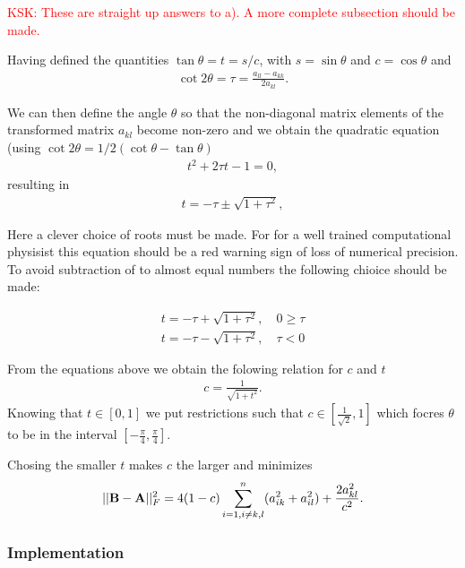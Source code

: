 \documentclass[11pt,a4paper,english,draft]{article}
\numberwithin{equation}{section}
\begin{document}
\textcolor{red}{KSK: These are straight up answers to a). A more complete subsection should be made.}

Having defined the quantities $\tan\theta = t= s/c$, with $s=\sin\theta$ and $c=\cos\theta$ and
\begin{gather}\cot 2\theta=\tau = \frac{a_{ll}-a_{kk}}{2a_{kl}}.
\end{gather}

We can then define the angle $\theta$ so that the non-diagonal matrix elements of the transformed matrix 
$a_{kl}$ become non-zero and
we obtain the quadratic equation (using $\cot 2\theta=1/2(\cot \theta-\tan\theta)$
\begin{gather}
t^2+2\tau t-1= 0,
\end{gather}
resulting in 
\begin{gather}
  t = -\tau \pm \sqrt{1+\tau^2},
\end{gather}

Here a clever choice of roots must be made. For for a well trained computational physisist this equation should be a red warning sign of loss of numerical precision. To avoid subtraction of to almost equal numbers the following chioice should be made:

\begin{align*}
t=  -\tau + \sqrt{1+\tau^2}, \quad   0  \geq \tau \\
t=  -\tau - \sqrt{1+\tau^2}, \quad   \tau <  0
\end{align*}

From the equations above we obtain the folowing relation for $c$ and $t$
\begin{gather}
   c = \frac{1}{\sqrt{1+t^2}}.
\end{gather}
Knowing that $t \in [0,1]$ we put restrictions such that $c \in [\frac{1}{\sqrt{2}}, 1]$ which focres $\theta$ to be in the interval $[- \frac{\pi}{4},\frac{\pi}{4}]$.  

Chosing the smaller $t$ makes $c$ the larger and minimizes 
\begin{gather}
||{\bf B}-{\bf A}||_F^2=4(1-c)\sum_{i=1,i\ne k,l}^n(a_{ik}^2+a_{il}^2) +\frac{2a_{kl}^2}{c^2}.
\end{gather}




\subsubsection{Implementation}
\end{document}
